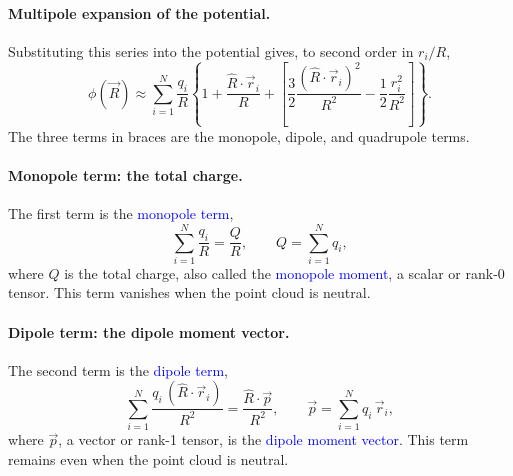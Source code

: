 \paragraph{Multipole expansion of the potential.}
Substituting this series into the potential gives, to second order in $r_i/R$,
\begin{equation}
    \boxed{
    \phi(\vec R) \approx \sum_{i=1}^{N}\frac{q_i}{R}
    \left\{1 + \frac{\hat R\cdot\vec r_i}{R}
    + \left[\frac{3}{2}\frac{(\hat R\cdot\vec r_i)^2}{R^2} - \frac{1}{2}\frac{r_i^2}{R^2}\right]\right\}.
    }
\end{equation}
The three terms in braces are the monopole, dipole, and quadrupole terms.

\paragraph{Monopole term: the total charge.}
The first term is the \textcolor{blue}{monopole term},
\begin{equation}
    \boxed{
    \sum_{i=1}^{N}\frac{q_i}{R} = \frac{Q}{R}, \qquad Q = \sum_{i=1}^{N} q_i,
    }
\end{equation}
where $Q$ is the total charge, also called the \textcolor{blue}{monopole moment}, a scalar or rank-0 tensor. This term vanishes when the point cloud is neutral.

\paragraph{Dipole term: the dipole moment vector.}
The second term is the \textcolor{blue}{dipole term},
\begin{equation}
    \boxed{
    \sum_{i=1}^{N}\frac{q_i\,(\hat R\cdot\vec r_i)}{R^2} = \frac{\hat R\cdot\vec p}{R^2}, \qquad \vec p = \sum_{i=1}^{N} q_i\,\vec r_i,
    }
\end{equation}
where $\vec p$, a vector or rank-1 tensor, is the \textcolor{blue}{dipole moment vector}. This term remains even when the point cloud is neutral.

